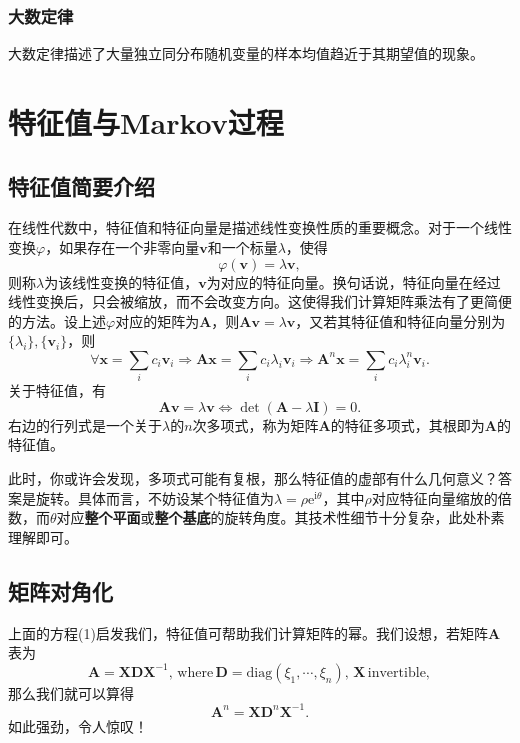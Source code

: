 \documentclass[a4paper, 12pt]{article}
\begin{document}
    \subsubsection{大数定律}
    大数定律描述了大量独立同分布随机变量的样本均值趋近于其期望值的现象。

    \section{特征值与Markov过程}

    \subsection{特征值简要介绍}

    在线性代数中，特征值和特征向量是描述线性变换性质的重要概念。对于一个线性变换$\varphi$，如果存在一个非零向量$\boldsymbol v$和一个标量$\lambda$，使得
    \[
    \varphi(\boldsymbol{v}) = \lambda \boldsymbol{v},
    \]
    则称$\lambda$为该线性变换的特征值，$\boldsymbol{v}$为对应的特征向量。换句话说，特征向量在经过线性变换后，只会被缩放，而不会改变方向。这使得我们计算矩阵乘法有了更简便的方法。设上述$\varphi$对应的矩阵为$\boldsymbol{A}$，则$\boldsymbol{A}\boldsymbol{v} = \lambda \boldsymbol{v}$，又若其特征值和特征向量分别为$\{\lambda_i\}, \{\boldsymbol{v}_i\}$，则
    \begin{equation}
        \forall \boldsymbol{x} = \sum_i c_i \boldsymbol{v}_i\Rightarrow \boldsymbol{A}\boldsymbol{x} = \sum_i c_i \lambda_i \boldsymbol{v}_i\Rightarrow \boldsymbol{A}^n\boldsymbol{x} = \sum_i c_i \lambda_i^n \boldsymbol{v}_i.
    \end{equation}
    关于特征值，有
    \[
    \boldsymbol{A}\boldsymbol{v} = \lambda \boldsymbol{v} \Leftrightarrow \det(\boldsymbol{A}-\lambda \boldsymbol{I})=0.
    \]
    右边的行列式是一个关于$\lambda$的$n$次多项式，称为矩阵$\boldsymbol{A}$的特征多项式，其根即为$\boldsymbol{A}$的特征值。
    
    此时，你或许会发现，多项式可能有复根，那么特征值的虚部有什么几何意义？答案是旋转。具体而言，不妨设某个特征值为$\lambda=\rho\mathrm e^{\mathrm i\theta}$，其中$\rho$对应特征向量缩放的倍数，而$\theta$对应\textbf{整个平面}或\textbf{整个基底}的旋转角度。其技术性细节十分复杂，此处朴素理解即可。

    \subsection{矩阵对角化}

    上面的方程(1)启发我们，特征值可帮助我们计算矩阵的幂。我们设想，若矩阵$\boldsymbol A$表为
    \[
    \boldsymbol A=\boldsymbol X\boldsymbol D\boldsymbol X^{-1},\,\mathrm{where}\,\boldsymbol D=\mathrm{diag}(\xi_1,\cdots,\xi_n),\,\boldsymbol X\,\mathrm{invertible},
    \]
    那么我们就可以算得
    \[
    \boldsymbol A^n = \boldsymbol X\boldsymbol D^n\boldsymbol X^{-1}.
    \]
    如此强劲，令人惊叹！
    
\end{document}
